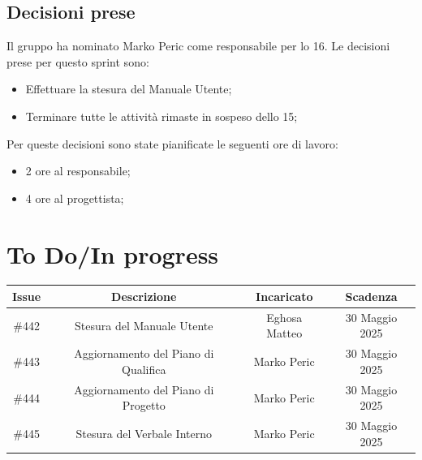 \documentclass[a4paper, 12pt]{article}
\begin{document}
\subsection{Decisioni prese}
    Il gruppo ha nominato Marko Peric come responsabile per lo  16.
    Le decisioni prese per questo sprint sono:
    \begin{itemize}
        \item Effettuare la stesura del Manuale Utente;
        \item Terminare tutte le attività rimaste in sospeso dello  15;
    \end{itemize}
    Per queste decisioni sono state pianificate le seguenti ore di lavoro:
    \begin{itemize}  
        \item 2 ore al responsabile;
        \item 4 ore al progettista;
    \end{itemize}

\section{To Do/In progress}
\begin{tabularx}{\textwidth}{|c|C|C|C|}
    \hline
        \textbf{Issue} & \textbf{Descrizione} & \textbf{Incaricato} & \textbf{Scadenza}\\
    \hline    
        \#442 & Stesura del Manuale Utente & Eghosa Matteo & 30 Maggio 2025\\
    \hline
        \#443 & Aggiornamento del Piano di Qualifica & Marko Peric & 30 Maggio 2025\\
    \hline
        \#444 & Aggiornamento del Piano di Progetto & Marko Peric & 30 Maggio 2025\\
    \hline
        \#445 & Stesura del Verbale Interno & Marko Peric & 30 Maggio 2025\\
    \hline
    \end{tabularx}
\end{document}
